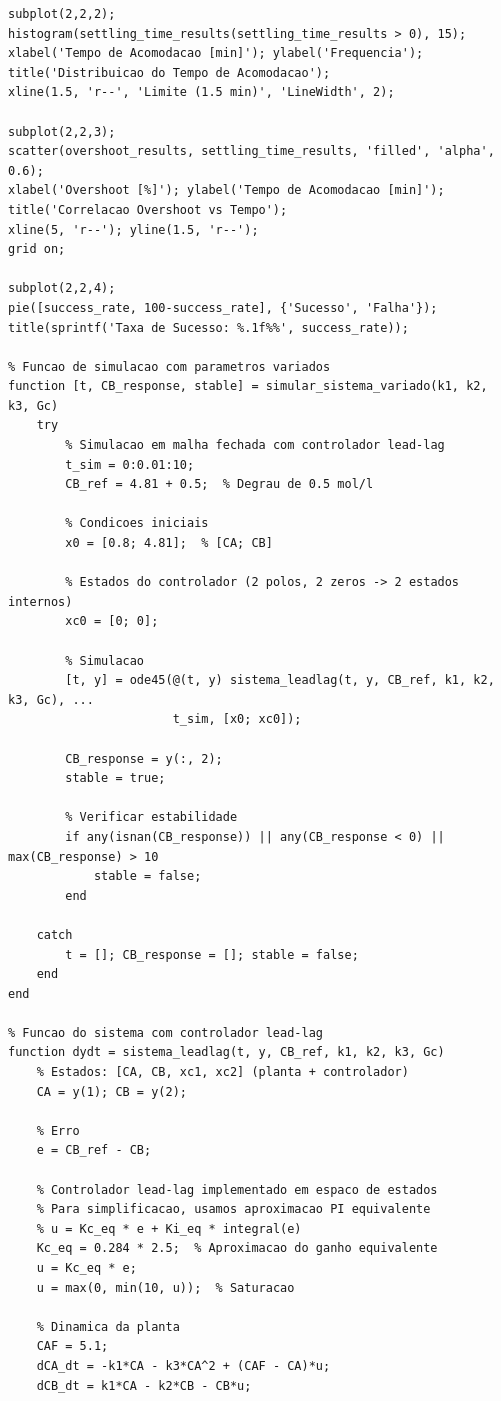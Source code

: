 \documentclass[a4paper,12pt]{article}
\begin{document}
\begin{lstlisting}[caption=Simulacao de robustez - Controlador Lead-Lag]
subplot(2,2,2);
histogram(settling_time_results(settling_time_results > 0), 15);
xlabel('Tempo de Acomodacao [min]'); ylabel('Frequencia');
title('Distribuicao do Tempo de Acomodacao');
xline(1.5, 'r--', 'Limite (1.5 min)', 'LineWidth', 2);

subplot(2,2,3);
scatter(overshoot_results, settling_time_results, 'filled', 'alpha', 0.6);
xlabel('Overshoot [%]'); ylabel('Tempo de Acomodacao [min]');
title('Correlacao Overshoot vs Tempo');
xline(5, 'r--'); yline(1.5, 'r--');
grid on;

subplot(2,2,4);
pie([success_rate, 100-success_rate], {'Sucesso', 'Falha'});
title(sprintf('Taxa de Sucesso: %.1f%%', success_rate));

% Funcao de simulacao com parametros variados
function [t, CB_response, stable] = simular_sistema_variado(k1, k2, k3, Gc)
    try
        % Simulacao em malha fechada com controlador lead-lag
        t_sim = 0:0.01:10;
        CB_ref = 4.81 + 0.5;  % Degrau de 0.5 mol/l
        
        % Condicoes iniciais
        x0 = [0.8; 4.81];  % [CA; CB]
        
        % Estados do controlador (2 polos, 2 zeros -> 2 estados internos)
        xc0 = [0; 0];
        
        % Simulacao
        [t, y] = ode45(@(t, y) sistema_leadlag(t, y, CB_ref, k1, k2, k3, Gc), ...
                       t_sim, [x0; xc0]);
        
        CB_response = y(:, 2);
        stable = true;
        
        % Verificar estabilidade
        if any(isnan(CB_response)) || any(CB_response < 0) || max(CB_response) > 10
            stable = false;
        end
        
    catch
        t = []; CB_response = []; stable = false;
    end
end

% Funcao do sistema com controlador lead-lag
function dydt = sistema_leadlag(t, y, CB_ref, k1, k2, k3, Gc)
    % Estados: [CA, CB, xc1, xc2] (planta + controlador)
    CA = y(1); CB = y(2);
    
    % Erro
    e = CB_ref - CB;
    
    % Controlador lead-lag implementado em espaco de estados
    % Para simplificacao, usamos aproximacao PI equivalente
    % u = Kc_eq * e + Ki_eq * integral(e)
    Kc_eq = 0.284 * 2.5;  % Aproximacao do ganho equivalente
    u = Kc_eq * e;
    u = max(0, min(10, u));  % Saturacao
    
    % Dinamica da planta
    CAF = 5.1;
    dCA_dt = -k1*CA - k3*CA^2 + (CAF - CA)*u;
    dCB_dt = k1*CA - k2*CB - CB*u;
    

\end{lstlisting}
\end{document}
